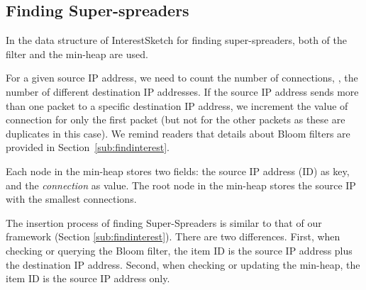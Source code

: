 \vvv\vvv\vvv
\presec
\subsection{Finding Super-spreaders} \postsec
\label{sec:basicAlgorithm:SS}

In the data structure of InterestSketch for finding super-spreaders, both of the filter and the min-heap are used.  

For a given source IP address, we need to count the number of connections, \ie, the number of different destination IP addresses. 
%
If the source IP address sends more than one packet to a specific destination IP address, we increment the value of connection for only the first packet (but not for the other packets as these are duplicates in this case).
%
{
\color{reviewD}
We remind readers that details about Bloom filters are provided in Section~\ref{sub:findinterest}.
}


%
Each node in the min-heap stores two fields: the source IP address (ID) as key, and the \textit{connection} as value. 
%
The root node in the min-heap stores the source IP with the smallest connections.

{\color{reviewD}
The insertion process of finding Super-Spreaders is similar to that of our framework (Section \ref{sub:findinterest}).
There are two differences.
First, when checking or querying the Bloom filter, the item ID is the source IP address plus the destination IP address.
Second, when checking or updating the min-heap, the item ID is the source IP address only.
}

